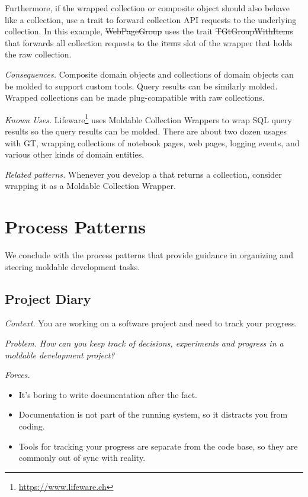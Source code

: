 \documentclass[acmsmall,screen,authorversion,nonacm]{acmart} %
\newcommand\cp[1]{\nbe{Cesare}{#1}{olive}} %
\newcommand{\pattern}[2]{\needlines{10}
\subsection*{#1}\label{pat:#2}}
\newcommand{\patref}[1]{\emph{\nameref{pat:#1}}\xspace}
\newcommand{\patsec}[1]{\noindent\textit{#1.}\xspace}
\begin{document}
Furthermore, if the wrapped collection or composite object should also behave like a collection, use a trait to forward collection API requests to the underlying collection.
In this example, \st{WebPageGroup} uses the trait \st{TGtGroupWithItems} that forwards all collection requests to the \st{items} slot of the wrapper that holds the raw collection.

\patsec{Consequences}
Composite domain objects and collections of domain objects can be molded to support custom tools.
Query results can be similarly molded.\\
Wrapped collections can be made plug-compatible with raw collections.

\patsec{Known Uses}
Lifeware\footnote{\url{https://www.lifeware.ch}} uses Moldable Collection Wrappers to wrap SQL query results so the query results can be molded.
There are about two dozen usages with GT, wrapping collections of notebook pages, web pages, logging events, and various other kinds of domain entities.

\patsec{Related patterns}
Whenever you develop a \patref{CustomSearch} that returns a collection, consider wrapping it as a Moldable Collection Wrapper.

\section{Process Patterns}\label{sec:process}

We conclude with the process patterns that provide guidance in organizing and steering moldable development tasks.

\pattern{Project Diary}{ProjectDiary}

\patsec{Context}
You are working on a software project and need to track your progress.

\patsec{Problem}
\emph{How can you keep track of decisions, experiments and progress in a moldable development project?}

\patsec{Forces}
\begin{itemize}[---]
\item It's boring to write documentation after the fact.
\item Documentation is not part of the running system, so it distracts you from coding.
\item Tools for tracking your progress are separate from the code base, so they are commonly out of sync with reality.
\end{itemize}
\end{document}
